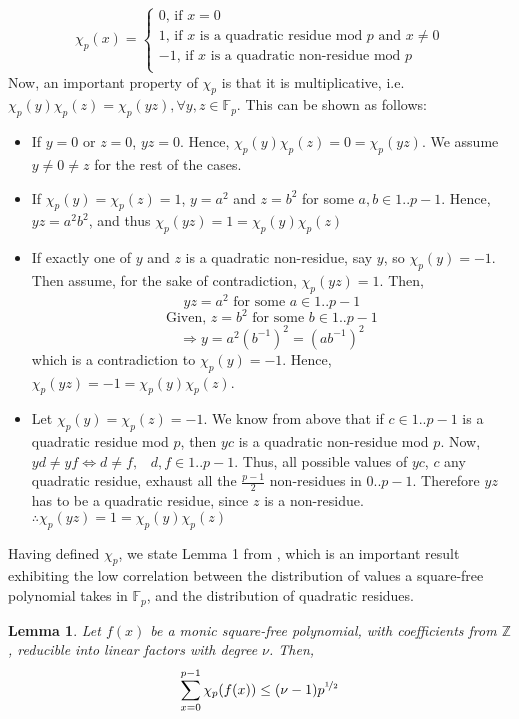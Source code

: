 \documentclass{article}
\newtheorem{lemma}{Lemma}
\begin{document}
\[
    \chi_p(x)=\left\{
                \begin{array}{ll}
                  0\textrm{, if }x=0\\
                  1\textrm{, if $x$ is a quadratic residue mod $p$ and $x\neq 0$}\\
                  -1\textrm{, if $x$ is a quadratic non-residue mod $p$}\\
                \end{array}
              \right.
  \]
  Now, an important property of $\chi_p$ is that it is multiplicative, i.e. $\chi_p(y)\chi_p(z)=\chi_p(yz), \forall y,z\in \mathbb{F}_p$. This can be shown as follows:
\begin{itemize}
    \item If $y= 0$ or $z= 0 $, $yz= 0 $. Hence, $\chi_p(y)\chi_p(z)=0=\chi_p(yz)$. We assume $y\neq 0 \neq z $ for the rest of the cases.
    
    \item If $\chi_p(y)=\chi_p(z)=1$, $y= a^2 $ and $z= b^2 $ for some $a,b\in 1..p-1$. Hence, $yz= a^2 b^2 $, and thus $\chi_p(yz)= 1= \chi_p(y) \chi_p(z)$
    
    \item If exactly one of $y$ and $z$ is a quadratic non-residue, say $y$, so $\chi_p(y)=-1$. Then assume, for the sake of contradiction, $\chi_p(yz)=1$. Then,
    $$yz= a^2  \textrm{ for some }a\in 1..p-1$$
    $$\text{Given, }z= b^2  \textrm{ for some }b\in 1..p-1$$
    $$\Rightarrow y = a^2 (b^{-1})^2 = (ab^{-1})^2 $$
    which is a contradiction to $\chi_p(y)=-1$. Hence, $\chi_p(yz)= -1 =\chi_p(y) \chi_p(z)$.
    
    \item Let $\chi_p(y)=\chi_p(z)=-1$. We know from above that if $c\in 1..p-1$ is a quadratic residue mod $p$, then $yc$ is a quadratic non-residue mod $p$. Now,  $yd\neq yf\Longleftrightarrow d\neq f \textrm{, { }}d,f\in 1..p-1$. Thus, all possible values of $yc$, $c$ any quadratic residue, exhaust all the $\frac{p-1}{2}$ non-residues in $0..p-1$. Therefore $yz$ has to be a quadratic residue, since $z$ is a non-residue.\\
    $\therefore \chi_p(yz)=1=\chi_p(y)\chi_p(z)$
\end{itemize}
%
Having defined $\chi_p$, we state Lemma 1 from \cite{burgess}, which is an important result exhibiting the low correlation between the distribution of values a square-free polynomial takes in $\mathbb{F}_p$, and the distribution of quadratic residues.
%
\begin{lemma}
Let $f(x)$ be a monic square-free polynomial, with coefficients from $\mathbb{Z}$, reducible into linear factors with degree $\nu$. Then,
$$\sum\limits_{x=0}^{p-1}\chi_p(f(x))\leq (\nu -1)p^{\nicefrac{1}{2}}$$
\end{lemma}
\end{document}
